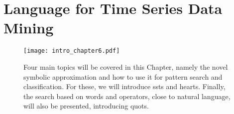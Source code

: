 
%

\chapter{Language for Time Series Data Mining}
\label{cha:text_}

\begin{figure}[h]
\centering
\texttt{[image: intro\_chapter6.pdf]}
\caption{Four main topics will be covered in this Chapter, namely the novel symbolic approximation and how to use it for pattern search and classification. For these, we will introduce \gls{ssts} and \gls{hearts}. Finally, the search based on words and operators, close to natural language, will also be presented, introducing \gls{quots}.}
\label{fig:l4tsdm}
\end{figure}

